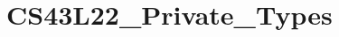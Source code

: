 \hypertarget{group___c_s43_l22___private___types}{}\section{C\+S43\+L22\+\_\+\+Private\+\_\+\+Types}
\label{group___c_s43_l22___private___types}
